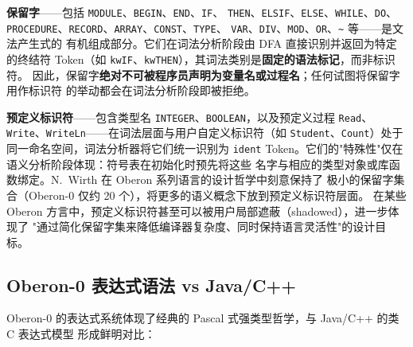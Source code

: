\documentclass[a4paper]{article}
\begin{document}
\textbf{保留字}——包括 \texttt{MODULE}、\texttt{BEGIN}、\texttt{END}、\texttt{IF}、
\texttt{THEN}、\texttt{ELSIF}、\texttt{ELSE}、\texttt{WHILE}、\texttt{DO}、
\texttt{PROCEDURE}、\texttt{RECORD}、\texttt{ARRAY}、\texttt{CONST}、\texttt{TYPE}、
\texttt{VAR}、\texttt{DIV}、\texttt{MOD}、\texttt{OR}、\texttt{\~{}} 等——是文法产生式的
有机组成部分。它们在词法分析阶段由 DFA 直接识别并返回为特定的终结符 Token（如
\texttt{kwIF}、\texttt{kwTHEN}），其词法类别是\textbf{固定的语法标记}，而非标识符。
因此，保留字\textbf{绝对不可被程序员声明为变量名或过程名}；任何试图将保留字用作标识符
的举动都会在词法分析阶段即被拒绝。

\textbf{预定义标识符}——包含类型名 \texttt{INTEGER}、\texttt{BOOLEAN}，以及预定义过程
\texttt{Read}、\texttt{Write}、\texttt{WriteLn}——在词法层面与用户自定义标识符（如
\texttt{Student}、\texttt{Count}）处于同一命名空间，词法分析器将它们统一识别为
\texttt{ident} Token。它们的"特殊性"仅在语义分析阶段体现：符号表在初始化时预先将这些
名字与相应的类型对象或库函数绑定。N.~Wirth 在 Oberon 系列语言的设计哲学中刻意保持了
极小的保留字集合（Oberon-0 仅约 20 个），将更多的语义概念下放到预定义标识符层面。
在某些 Oberon 方言中，预定义标识符甚至可以被用户局部遮蔽（shadowed），进一步体现了
"通过简化保留字集来降低编译器复杂度、同时保持语言灵活性"的设计目标。

\subsection{Oberon-0 表达式语法 vs Java/C++}

Oberon-0 的表达式系统体现了经典的 Pascal 式强类型哲学，与 Java/C++ 的类 C 表达式模型
形成鲜明对比：
\end{document}
